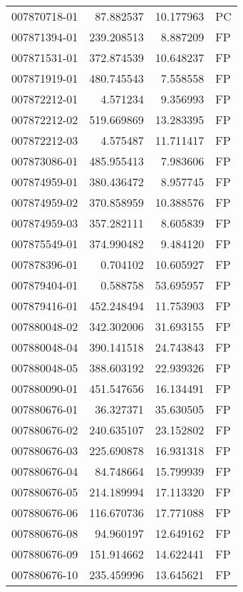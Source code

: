 \begin{tabular}{lrrl}
007870718-01 &   87.882537 &      10.177963 &   PC \\
007871394-01 &  239.208513 &       8.887209 &   FP \\
007871531-01 &  372.874539 &      10.648237 &   FP \\
007871919-01 &  480.745543 &       7.558558 &   FP \\
007872212-01 &    4.571234 &       9.356993 &   FP \\
007872212-02 &  519.669869 &      13.283395 &   FP \\
007872212-03 &    4.575487 &      11.711417 &   FP \\
007873086-01 &  485.955413 &       7.983606 &   FP \\
007874959-01 &  380.436472 &       8.957745 &   FP \\
007874959-02 &  370.858959 &      10.388576 &   FP \\
007874959-03 &  357.282111 &       8.605839 &   FP \\
007875549-01 &  374.990482 &       9.484120 &   FP \\
007878396-01 &    0.704102 &      10.605927 &   FP \\
007879404-01 &    0.588758 &      53.695957 &   FP \\
007879416-01 &  452.248494 &      11.753903 &   FP \\
007880048-02 &  342.302006 &      31.693155 &   FP \\
007880048-04 &  390.141518 &      24.743843 &   FP \\
007880048-05 &  388.603192 &      22.939326 &   FP \\
007880090-01 &  451.547656 &      16.134491 &   FP \\
007880676-01 &   36.327371 &      35.630505 &   FP \\
007880676-02 &  240.635107 &      23.152802 &   FP \\
007880676-03 &  225.690878 &      16.931318 &   FP \\
007880676-04 &   84.748664 &      15.799939 &   FP \\
007880676-05 &  214.189994 &      17.113320 &   FP \\
007880676-06 &  116.670736 &      17.771088 &   FP \\
007880676-08 &   94.960197 &      12.649162 &   FP \\
007880676-09 &  151.914662 &      14.622441 &   FP \\
007880676-10 &  235.459996 &      13.645621 &   FP \\

\end{tabular}
